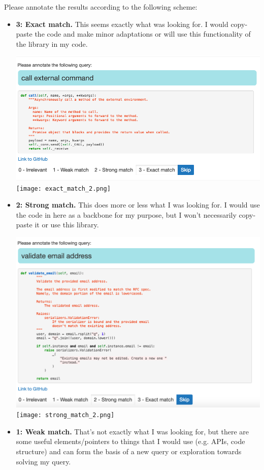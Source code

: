 \documentclass[12 pt]{article}
\begin{document}
Please annotate the results according to the following scheme:
\begin{itemize}
	\item {\bf 3: Exact match.} This seems exactly what was looking for. I would copy-paste the code and make minor adaptations or will use this functionality of the library in my code. 

	\includegraphics[width=\textwidth]{exact_match.png}
	\texttt{[image: exact\_match\_2.png]}
	\item {\bf 2: Strong match.} This does more or less what I was looking for. I would use the code in here as a backbone for my purpose, but I won't necessarily copy-paste it or use this library.

	\includegraphics[width=\textwidth]{strong_match}
	\texttt{[image: strong\_match\_2.png]}
	\item {\bf 1: Weak match.} That's not exactly what I was looking for, but there are some useful elements/pointers to things that I would use (e.g. APIs, code structure) and can form the basis of a new query or exploration towards solving my query.


\end{itemize}
\end{document}
